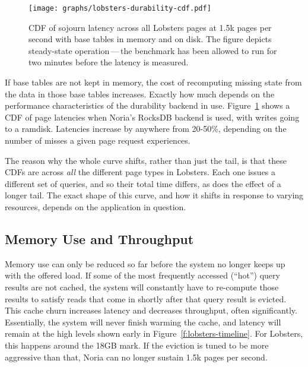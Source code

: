 \begin{figure}[h]
  \centering
  \texttt{[image: graphs/lobsters-durability-cdf.pdf]}
  \caption{CDF of sojourn latency across all Lobsters pages at 1.5k pages per
  second with base tables in memory and on disk. The figure depicts steady-state
  operation\,---\,the benchmark has been allowed to run for two minutes before
  the latency is measured.}
  \label{f:lobsters-dur-latency}
\end{figure}

If base tables are not kept in memory, the cost of recomputing missing state
from the data in those base tables increases. Exactly how much depends on the
performance characteristics of the durability backend in use.
Figure~\ref{f:lobsters-dur-latency} shows a CDF of page latencies when Noria's
RocksDB backend is used, with writes going to a ramdisk. Latencies increase by
anywhere from 20-50\%, depending on the number of misses a given page request
experiences.

The reason why the whole curve shifts, rather than just the tail, is that these
CDFs are across \emph{all} the different page types in Lobsters. Each one issues
a different set of queries, and so their total time differs, as does the effect
of a longer tail. The exact shape of this curve, and how it shifts in response
to varying resources, depends on the application in question.


\subsection{Memory Use and Throughput}

Memory use can only be reduced so far before the system no longer keeps up with
the offered load. If some of the most frequently accessed (``hot'') query
results are not cached, the system will constantly have to re-compute those
results to satisfy reads that come in shortly after that query result is
evicted. This cache churn increases latency and decreases throughput, often
significantly. Essentially, the system will never finish warming the cache, and
latency will remain at the high levels shown early in
Figure~\ref{f:lobsters-timeline}. For Lobsters, this happens around the 18GB
mark. If the eviction is tuned to be more aggressive than that, Noria can no
longer sustain 1.5k pages per second.


